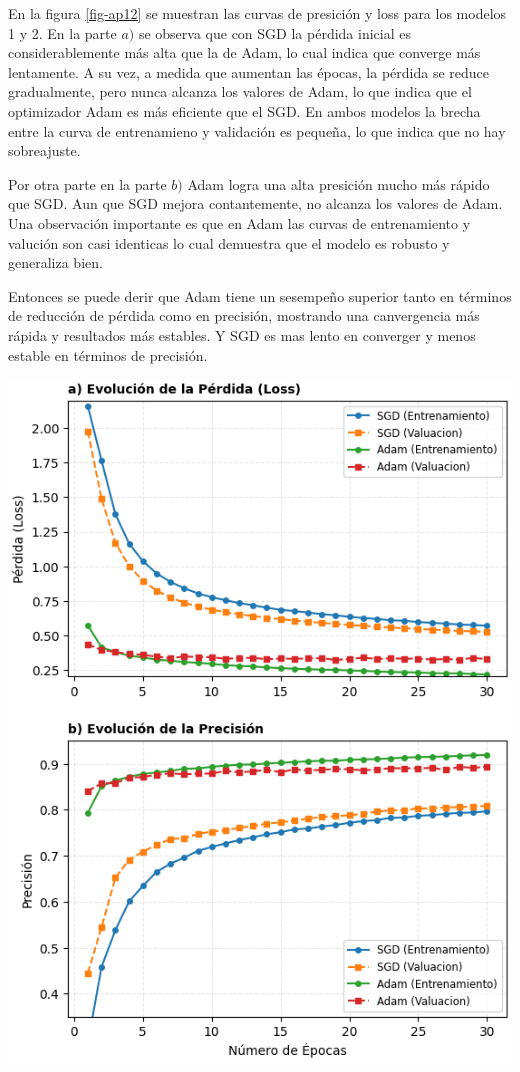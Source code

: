 \documentclass[aps,prl,reprint,groupedaddress]{revtex4-2}
\newenvironment{Figura}
  {\par\medskip\noindent\minipage{\linewidth}}
  {\endminipage\par\medskip}
\begin{document}
En la figura \ref{fig-ap12} se muestran las curvas de presición y loss para los
modelos 1 y 2. En la parte $a)$ se observa que con SGD la pérdida inicial es 
considerablemente más alta que la de Adam, lo cual indica que converge más 
lentamente.  A su vez, a medida que aumentan las épocas, la pérdida se reduce 
gradualmente, pero nunca alcanza los valores de Adam, lo que indica que el
optimizador Adam es más eficiente que el SGD. En ambos modelos la brecha 
entre la curva de entrenamieno y validación es pequeña, lo que indica que no
hay sobreajuste.

Por otra parte en la parte $b)$ Adam logra una alta presición mucho más rápido
que SGD. Aun que SGD mejora contantemente, no alcanza los valores de Adam. 
Una observación importante es que en Adam las curvas de entrenamiento y 
valución son casi identicas lo cual demuestra que el modelo es robusto y 
generaliza bien.

Entonces se puede derir que Adam tiene un sesempeño superior tanto en términos 
de reducción de pérdida como en precisión, mostrando una canvergencia más 
rápida y resultados más estables. Y SGD es mas lento en converger y menos
estable en términos de precisión. 

\begin{Figura}
  \centering
  \includegraphics[width=1\textwidth]{figs/modelos_plots.png}
  \label{fig-ap12}
\end{Figura}
\end{document}
